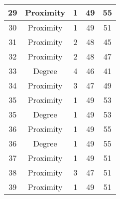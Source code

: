 \documentclass[results.tex]{subfiles}
\begin{document}
\begin{center}
\begin{tabular}{| c || c | c | c | c |}
            \hline
            29                      & Proximity                    & 1                      & 49                      & 55                   \\
            \hline
            30                      & Proximity                    & 1                      & 49                      & 51                   \\
            \hline
            31                      & Proximity                    & 2                      & 48                      & 45                   \\
            \hline
            32                      & Proximity                    & 2                      & 48                      & 47                   \\
            \hline
            33                      & Degree                       & 4                      & 46                      & 41                   \\
            \hline
            34                      & Proximity                    & 3                      & 47                      & 49                   \\
            \hline
            35                      & Proximity                    & 1                      & 49                      & 53                   \\
            \hline
            35                      & Degree                       & 1                      & 49                      & 53                   \\
            \hline
            36                      & Proximity                    & 1                      & 49                      & 55                   \\
            \hline
            36                      & Degree                       & 1                      & 49                      & 55                   \\
            \hline
            37                      & Proximity                    & 1                      & 49                      & 51                   \\
            \hline
            38                      & Proximity                    & 3                      & 47                      & 51                   \\
            \hline
            39                      & Proximity                    & 1                      & 49                      & 51                   \\

\end{tabular}
\end{center}
\end{document}

